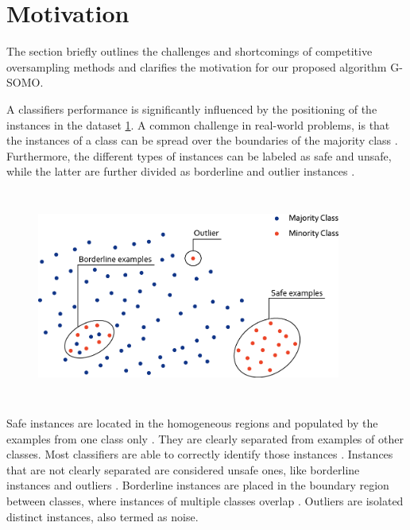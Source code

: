 \documentclass[parskip=full]{scrartcl}
\begin{document}
\section{Motivation}

The section briefly outlines the challenges and shortcomings of competitive
oversampling methods and clarifies the motivation for our proposed algorithm
G-SOMO.

A classifiers performance is significantly influenced by the positioning of the instances in the dataset \ref{fig:Sez}. A common challenge in real-world problems, is that the instances of a class can be spread over the boundaries of the majority class \cite{Tang2007}. Furthermore, the different types of instances can be labeled as safe and unsafe, while the latter are further divided as borderline and outlier instances \cite{Sez2016}.

\begin{figure}[H]
	\centering
	\includegraphics[width=10cm,height=7cm, keepaspectratio]{../analysis/fig2.png}
	\label{fig:Sez}
\end{figure}

Safe instances are located in the homogeneous regions and populated by the
examples from one class only \cite{rodriguez2012}. They are clearly separated from examples of other classes. Most classifiers are able to correctly identify those instances \cite{Prati2004B}. Instances that are not clearly separated are considered unsafe ones, like borderline instances and outliers \cite{Kubat1997}. Borderline instances are placed in the boundary region between classes, where instances of multiple classes overlap \cite{Sez2016}. Outliers are isolated distinct instances, also termed as noise.
\end{document}
